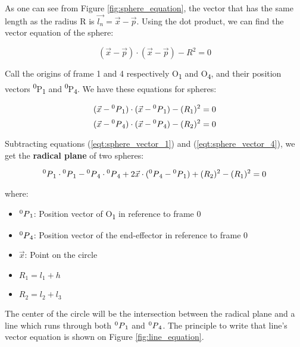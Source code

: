 \documentclass[conference]{IEEEtran}
\def\SP#1{\textsuperscript{\textcolor{black}{#1}}}
\def\SB#1{\textsubscript{\textcolor{black}{#1}}}
\begin{document}
  As one can see from Figure \ref{fig:sphere_equation}, the vector that has the same length as the radius R is $\vec{l_n} = \vec{x} - \vec{p}$. Using the dot product, we can find the vector equation of the sphere:
  \begin{center}
  	\begin{equation} \label{eqt:sphere_vector}
  	(\vec{x} - \vec{p})\cdot(\vec{x} - \vec{p}) - R^2 = 0
  	\end{equation}
  \end{center}
  Call the origins of frame 1 and 4 respectively O\SB{1} and O\SB{4}, and their position vectors \SP{0}P\SB{1} and \SP{0}P\SB{4}.  We have these equations for spheres:
  \begin{center}
  	\begin{equation} \label{eqt:sphere_vector_1}
  	(\vec{x} - \SP{0}P\SB{1})\cdot(\vec{x} - \SP{0}P\SB{1}) - (R_1)^2 = 0
  	\end{equation}
  	\begin{equation} \label{eqt:sphere_vector_4}
  	(\vec{x} - \SP{0}P\SB{4})\cdot(\vec{x} - \SP{0}P\SB{4}) - (R_2)^2 = 0
  	\end{equation}
  \end{center}
  Subtracting equations (\ref{eqt:sphere_vector_1}) and (\ref{eqt:sphere_vector_4}), we get the \textbf{radical plane} of two spheres:
  \begin{center}
  	\begin{equation} \label{eqt:radical_plane}
  	\SP{0}P\SB{1} \cdot \SP{0}P\SB{1} - \SP{0}P\SB{4} \cdot \SP{0}P\SB{4} + 2 \vec{x} \cdot (\SP{0}P\SB{4} - \SP{0}P\SB{1}) + (R_2)^2 - (R_1)^2 = 0
  	\end{equation}
  \end{center}
  where:
  \begin{itemize}
  \item $\SP{0}P\SB{1}$: Position vector of O\SB{1} in reference to frame 0
  \item $\SP{0}P\SB{4}$: Position vector of the end-effector in reference to frame 0
  \item $\vec{x}$: Point on the circle
  \item $R_1 = l_1 + h$
  \item $R_2 = l_2 + l_3$
  \end{itemize}
  The center of the circle will be the intersection between the radical plane and a line which runs through both $\SP{0}P\SB{1}$ and $\SP{0}P\SB{4}$. The principle to write that line's vector equation is shown on Figure \ref{fig:line_equation}.
  
\end{document}
